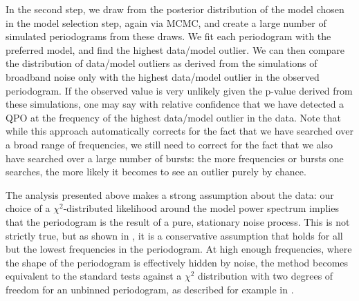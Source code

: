 \documentclass[numberedappendix]{emulateapj}
\begin{document}
In the second step, we draw from the posterior distribution of the model chosen in the model selection step, again via MCMC, and create a large number of simulated periodograms from these draws. We fit each periodogram with the preferred model, and find the highest data/model outlier. We can then compare the distribution of data/model outliers as derived from the simulations of broadband noise only with the highest data/model outlier in the observed periodogram. If the observed value is very unlikely given the p-value derived from these simulations, one may say with relative confidence that we have detected a QPO at the frequency of the highest data/model outlier in the data. Note that while this approach automatically corrects for the fact that we have searched over a broad range of frequencies, we still need to correct for the fact that we also have searched over a large number of bursts: the more frequencies or bursts one searches, the more likely it becomes to see an outlier purely by chance. 

The analysis presented above makes a strong assumption about the data: our choice of a $\chi^2$-distributed likelihood around the model power spectrum implies that the periodogram is the result of a pure, stationary noise process. This is not strictly true, but as shown in \citet{huppenkothen2013}, it is a conservative assumption that holds for all but the lowest frequencies in the periodogram. At high enough frequencies, where the shape of the periodogram is effectively hidden by noise, the method becomes equivalent to the standard tests against a $\chi^2$ distribution with two degrees of freedom for an unbinned periodogram, as described for example in \citet{vanderklis1989}.
\end{document}
